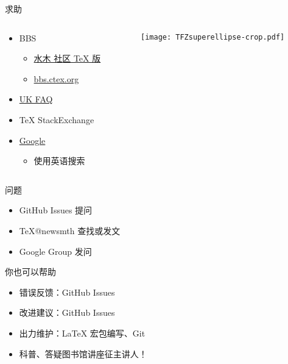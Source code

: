\begin{frame}{求助}
	\begin{columns}[c]
		\begin{column}{.45\textwidth}
			\begin{itemize}
				\item BBS
					\begin{itemize}
						\item \href{http://www.newsmth.net/nForum/board/TeX}{水木
							社区 TeX 版}
						\item \href{http://bbs.ctex.org/}{bbs.ctex.org}
					\end{itemize}
				\item \href{http://www.tex.ac.uk/cgi-bin/texfaq2html}{UK FAQ}
				\item TeX StackExchange
				\item \href{http://justfuckinggoogleit.com/}{Google}
          \begin{itemize}
            \item 使用英语搜索
          \end{itemize}
			\end{itemize}
		\end{column}
		\begin{column}{.45\textwidth}
			\texttt{[image: TFZsuperellipse-crop.pdf]}
		\end{column}
	\end{columns}
\end{frame}

\begin{frame}{\ThuThesis 问题}
	\begin{itemize}
		\item GitHub Issues 提问
		\item \TeX @newsmth 查找或发文
		\item \href{http://groups.google.com/group/thuthesis}\ThuThesis{} Google Group 发问
	\end{itemize}
\end{frame}


\begin{frame}{你也可以帮助}
	\begin{itemize}
		\item 错误反馈：GitHub Issues
		\item 改进建议：GitHub Issues
		\item 出力维护：LaTeX 宏包编写、Git
		\item 科普、答疑\pause \hspace{2em}\alert{图书馆讲座征主讲人！}
	\end{itemize}
\end{frame}

